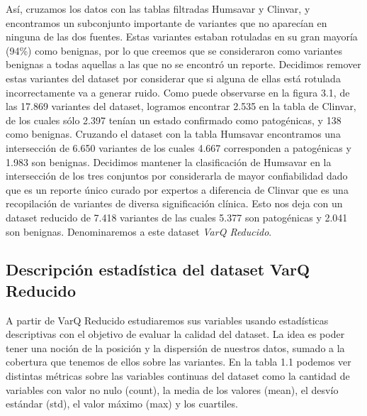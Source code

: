 Así, cruzamos los datos con las tablas filtradas Humsavar y Clinvar, y encontramos un subconjunto importante de variantes que no aparecían en ninguna de las dos fuentes. Estas variantes estaban rotuladas en su gran mayoría (94\%) como benignas, por lo que creemos que se consideraron como variantes benignas a todas aquellas a las que no se encontró un reporte. Decidimos remover estas variantes del dataset por considerar que si alguna de ellas está rotulada incorrectamente va a generar ruido. Como puede observarse en la figura 3.1, de las 17.869 variantes del dataset, logramos encontrar 2.535 en la tabla de Clinvar, de los cuales sólo 2.397 tenían un estado confirmado como patogénicas, y 138 como benignas. Cruzando el dataset con la tabla Humsavar encontramos una intersección de 6.650 variantes de los cuales 4.667 corresponden a patogénicas y 1.983 son benignas. Decidimos mantener la clasificación de Humsavar en la intersección de los tres conjuntos por considerarla de mayor confiabilidad dado que es un reporte único curado por expertos a diferencia de Clinvar que es una recopilación de variantes de diversa significación clínica. Esto nos deja con un dataset reducido de 7.418 variantes de las cuales 5.377 son patogénicas y 2.041 son benignas. Denominaremos a este dataset \textit{VarQ Reducido}. 


\subsection{Descripción estadística del dataset VarQ Reducido}

A partir de VarQ Reducido estudiaremos sus variables usando estadísticas descriptivas con el objetivo de evaluar la calidad del dataset. La idea es poder tener una noción de la posición y la dispersión de nuestros datos, sumado a la cobertura que tenemos de ellos sobre las variantes. En la tabla 1.1 podemos ver distintas métricas sobre las variables continuas del dataset como la cantidad de variables con valor no nulo (count), la media de los valores (mean), el desvío estándar (std), el valor máximo (max) y los cuartiles. 

